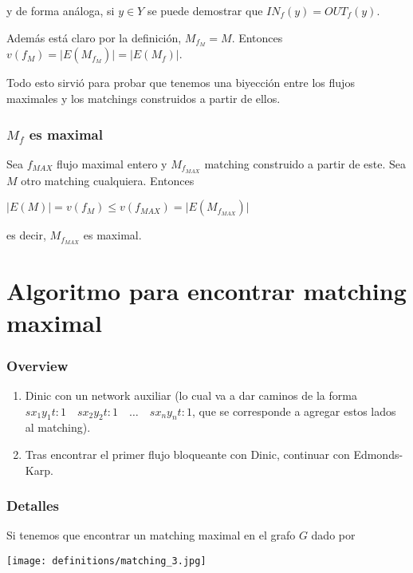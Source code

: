 \documentclass[10pt,a4paper]{article}
\begin{document}
y de forma análoga, si $y \in Y$ se puede demostrar que $IN_f(y) = OUT_f(y)$.

Además está claro por la definición, $M_{f_M} = M$. Entonces $v(f_M) = \lvert E(M_{f_M})\rvert = \lvert E(M_f)\rvert$.

Todo esto sirvió para probar que tenemos una biyección entre los flujos maximales y los matchings construidos a partir de ellos.

\subsubsection*{$M_f$ es maximal}

Sea $f_{MAX}$ flujo maximal entero y $M_{f_{MAX}}$ matching construido a partir de este. Sea $M$ otro matching cualquiera. Entonces

\begin{center}
$\lvert E(M)\rvert = v(f_M) \leq v(f_{MAX}) = \lvert E(M_{f_{MAX}})\rvert$
\end{center}

es decir, $M_{f_{MAX}}$ es maximal.

\section*{Algoritmo para encontrar matching maximal}

\subsubsection*{Overview}

\begin{enumerate}

	\item Dinic con un network auxiliar (lo cual va a dar caminos de la forma $sx_1y_1t: 1\quad sx_2y_2t: 1\quad \dots\quad sx_ny_nt: 1$, que se corresponde a agregar estos lados al matching).
	\item Tras encontrar el primer flujo bloqueante con Dinic, continuar con Edmonds-Karp.
\end{enumerate}

\subsubsection*{Detalles}

Si tenemos que encontrar un matching maximal en el grafo $G$ dado por

\begin{center}

    \begin{adjustbox}{max size={\textwidth}{\textheight}}
        \texttt{[image: definitions/matching\_3.jpg]}
        \end{adjustbox}
    
\end{center}
\end{document}
